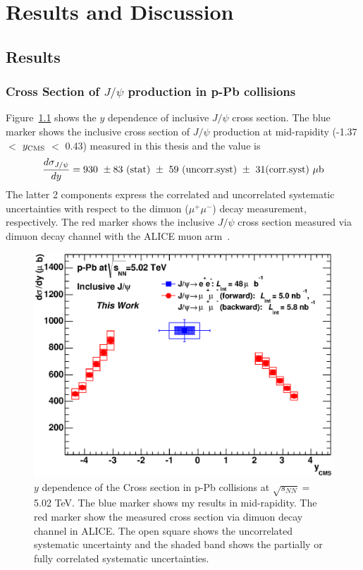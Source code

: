 \chapter{Results and Discussion}
\label{chap_dis}
\section{Results}
\subsection{Cross Section of $J/\psi$ production in p-Pb collisions}
\label{sec_5_crosssection}
Figure~\ref{fig_5_xsectiony} shows the $y$ dependence of inclusive $J/\psi$ cross section. 
The blue marker shows the inclusive cross section of $J/\psi$ production at mid-rapidity (-1.37 $<$ $y_{\rm{CMS}}$ $<$ 0.43) measured in this thesis and the value is
\begin{equation}
       \frac{d\sigma_{J/\psi}}{dy} =   930 ~\pm 83 ~\rm{(stat)} ~\pm ~59 ~\rm{(uncorr. syst)} ~\pm~ 31\rm{(corr. syst)} ~\mu  \rm{b}
\end{equation}
The latter 2 components express the correlated and uncorrelated systematic uncertainties with respect to the dimuon ($\mu^{+}\mu^{-}$) decay measurement, respectively.
The red marker shows the inclusive $J/\psi$ cross section measured via dimuon decay channel with the ALICE muon arm~\cite{bib_alicemuon}.
\begin{figure}[!h]
  \centering
  \includegraphics[width=12cm]{chap5/figure/CrossSection/JpsiCrossSection_MB_Y_tw.eps}
  \caption{$y$ dependence of the Cross section in p-Pb collisions at $\sqrt{s_{NN}}=$ 5.02 TeV. 
    The blue marker shows my results in mid-rapidity. 
    The red marker show the measured cross section via dimuon decay channel in ALICE. 
    The open square shows the uncorrelated systematic uncertainty and the shaded band shows the partially or fully correlated systematic uncertainties. 
  }
  \label{fig_5_xsectiony}
\end{figure}

